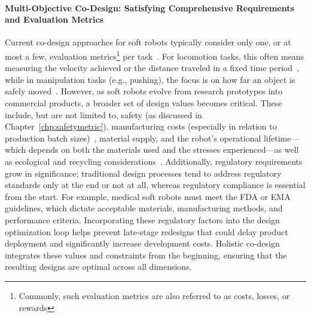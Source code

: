 \paragraph{Multi-Objective Co-Design: Satisfying Comprehensive Requirements and Evaluation Metrics}
Current co-design approaches for soft robots typically consider only one, or at most a few, evaluation metrics\footnote{Commonly, such evaluation metrics are also referred to as costs, losses, or rewards} per task~\citep{spielberg2019learning, spielberg2021co, medvet2022impact, wang2023preco, wang2024diffusebot, navez2024design}. For locomotion tasks, this often means measuring the velocity achieved or the distance traveled in a fixed time period~\citep{spielberg2019learning, wang2023preco}, while in manipulation tasks (e.g., pushing), the focus is on how far an object is safely moved~\citep{wang2024diffusebot}. However, as soft robots evolve from research prototypes into commercial products, a broader set of design values becomes critical. These include, but are not limited to, safety (as discussed in Chapter~\ref{chp:safetymetric}), manufacturing costs (especially in relation to production batch sizes)~\citep{miriyev2017soft, schmitt2018soft, majidi2014soft, junge2022leveraging}, material supply, and the robot’s operational lifetime—which depends on both the materials used and the stresses experienced—as well as ecological and recycling considerations~\citep{mazzolai2020vision}. Additionally, regulatory requirements grow in significance; traditional design processes tend to address regulatory standards only at the end or not at all, whereas regulatory compliance is essential from the start. For example, medical soft robots must meet the FDA or EMA guidelines, which dictate acceptable materials, manufacturing methods, and performance criteria. Incorporating these regulatory factors into the design optimization loop helps prevent late-stage redesigns that could delay product deployment and significantly increase development costs. Holistic co-design integrates these values and constraints from the beginning, ensuring that the resulting designs are optimal across all dimensions.

